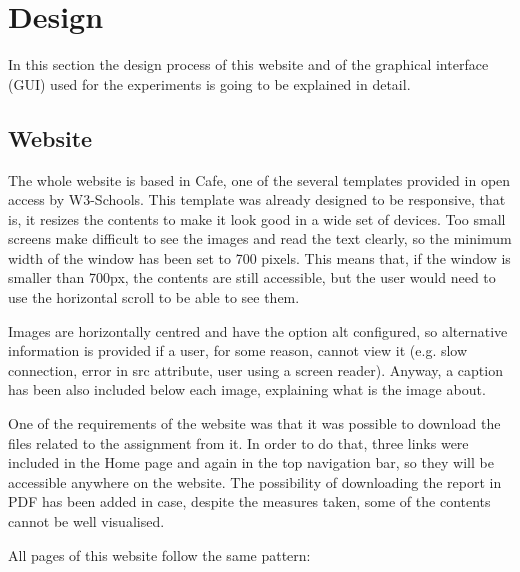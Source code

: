 \section{Design}
\label{sec:design}
In this section the design process of this website and of the graphical interface (GUI) used for the experiments is going to be explained in detail. 

\subsection{Website}
 The whole website is based in Cafe, one of the several templates provided in open access by W3-Schools. This template was already designed to be responsive, that is, it resizes the contents to make it look good in a wide set of devices. Too small screens make difficult to see the images and read the text clearly, so the minimum width of the window has been set to 700 pixels. This means that, if the window is smaller than 700px, the contents are still accessible, but the user would need to use the horizontal scroll to be able to see them.

Images are horizontally centred and have the option alt configured, so alternative information is provided if a user, for some reason, cannot view it (e.g. slow connection, error in src attribute, user using a screen reader). Anyway, a caption has been also included below each image, explaining what is the image about.

One of the requirements of the website was that it was possible to download the files related to the assignment from it. In order to do that, three links were included in the Home page and again in the top navigation bar, so they will be accessible anywhere on the website. The possibility of downloading the report in PDF has been added in case, despite the measures taken, some of the contents cannot be well visualised.

All pages of this website follow the same pattern:

